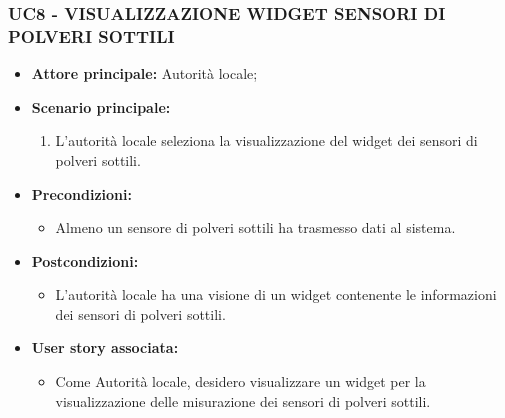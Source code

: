\subsubsection{UC8 - VISUALIZZAZIONE WIDGET SENSORI DI POLVERI SOTTILI}
\begin{itemize}
    \item \textbf{Attore principale:} Autorità locale;
    \item \textbf{Scenario principale:}
          \begin{enumerate}
              \item L'autorità locale seleziona la visualizzazione del widget dei sensori di polveri sottili.
          \end{enumerate}
    \item \textbf{Precondizioni:}
          \begin{itemize}
              \item  Almeno un sensore di polveri sottili ha trasmesso dati al sistema.
          \end{itemize}
    \item \textbf{Postcondizioni:}
          \begin{itemize}
              \item  L'autorità locale ha una visione di un widget contenente le informazioni dei sensori di polveri sottili.
          \end{itemize}
    \item \textbf{User story associata:}
          \begin{itemize}
              \item Come Autorità locale, desidero visualizzare un widget per la visualizzazione delle misurazione dei sensori di polveri sottili.
          \end{itemize}
\end{itemize}